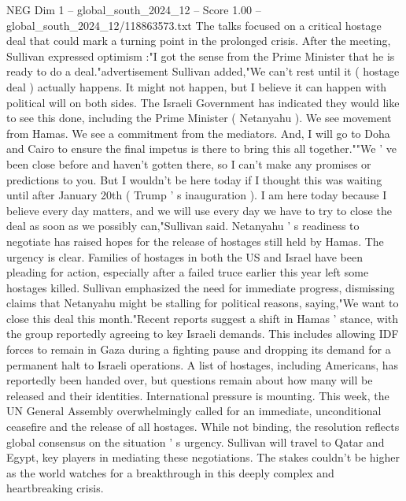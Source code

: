 \begin{textsample}{NEG Dim 1 – global\_south\_2024\_12 – Score 1.00 – global\_south\_2024\_12/118863573.txt}  \label{ex:f1_neg_347}
The talks focused on a critical hostage deal that could mark a turning point in the prolonged crisis.
After the meeting, Sullivan expressed optimism :"I got the sense from the Prime Minister that he is ready to do a deal."advertisement Sullivan added,"We can't rest until it ( hostage deal ) actually happens.
It might not happen, but I believe it can happen with political will on both sides.
The Israeli Government has indicated they would like to see this done, including the Prime Minister ( Netanyahu ).
We see movement from Hamas.
We see a commitment from the mediators.
And, I will go to Doha and Cairo to ensure the final impetus is there to bring this all together.""We ' ve been close before and haven't gotten there, so I can't make any promises or predictions to you.
But I wouldn't be here today if I thought this was waiting until after January 20th ( Trump ' s inauguration ).
I am here today because I believe every day matters, and we will use every day we have to try to close the deal as soon as we possibly can,"Sullivan said.
Netanyahu ' s readiness to negotiate has raised hopes for the release of hostages still held by Hamas.
The urgency is clear.
Families of hostages in both the US and Israel have been pleading for action, especially after a failed truce earlier this year left some hostages killed.
Sullivan emphasized the need for immediate progress, dismissing claims that Netanyahu might be stalling for political reasons, saying,"We want to close this deal this month."Recent reports suggest a shift in Hamas ' stance, with the group reportedly agreeing to key Israeli demands.
This includes allowing IDF forces to remain in Gaza during a fighting pause and dropping its demand for a permanent halt to Israeli operations.
A list of hostages, including Americans, has reportedly been handed over, but questions remain about how many will be released and their identities.
International pressure is mounting.
This week, the UN General Assembly overwhelmingly called for an immediate, unconditional ceasefire and the release of all hostages.
While not binding, the resolution reflects global consensus on the situation ' s urgency.
Sullivan will travel to Qatar and Egypt, key players in mediating these negotiations.
The stakes couldn't be higher as the world watches for a breakthrough in this deeply complex and heartbreaking crisis.

\end{textsample}
